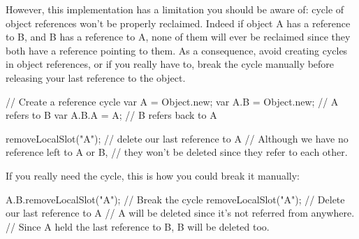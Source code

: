 However, this implementation has a limitation you should be aware of: cycle
of object references won't be properly reclaimed. Indeed if object A has a
reference to B, and B has a reference to A, none of them will ever be
reclaimed since they both have a reference pointing to them. As a
consequence, avoid creating cycles in object references, or if you really
have to, break the cycle manually before releasing your last reference to
the object.

\begin{urbiunchecked}
// Create a reference cycle
var A = Object.new;
var A.B = Object.new; // A refers to B
var A.B.A = A; // B refers back to A

removeLocalSlot("A"); // delete our last reference to A
// Although we have no reference left to A or B,
// they won't be deleted since they refer to each other.
\end{urbiunchecked}

If you really need the cycle, this is how you could break it manually:

\begin{urbiunchecked}
A.B.removeLocalSlot("A"); // Break the cycle
removeLocalSlot("A"); // Delete our last reference to A
// A will be deleted since it's not referred from anywhere.
// Since A held the last reference to B, B will be deleted too.
\end{urbiunchecked}


